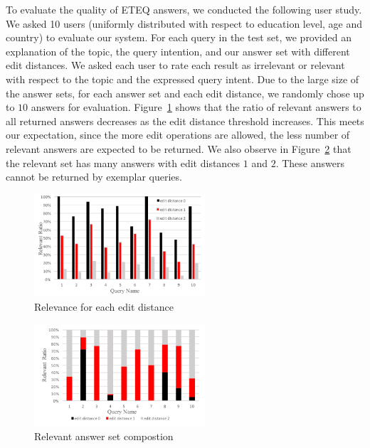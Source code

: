 \documentclass{sigmod}
\begin{document}
To evaluate the quality of ETEQ answers, we conducted the following user study. We asked 10 users (uniformly distributed with respect to education level, age and country) to evaluate our system. For each query in the test set, we provided an explanation of the topic, the query intention, and our answer set with different edit distances. We asked each user to rate each result as irrelevant or relevant with respect to the topic and the expressed query intent. Due to the large size of the answer sets, for each answer set and each edit distance, we randomly chose up to $10$ answers for evaluation. Figure~\ref{fig:relevance} shows that the ratio of relevant answers to all returned answers decreases as the edit distance threshold increases. This meets our expectation, since the more edit operations are allowed, the less number of relevant answers are expected to be returned. We also observe in Figure~\ref{fig:exqcomp1} that the relevant set has many answers with edit distances $1$ and $2$. These answers cannot be returned by exemplar queries. 


\begin{figure}[htbp] 
\setlength{\abovecaptionskip}{-0.5\baselineskip}
\setlength{\belowcaptionskip}{-0.5\baselineskip}
\centering\includegraphics[width=2.5in]{relevance.pdf} 
\caption{Relevance for each edit distance}
\label{fig:relevance}
\end{figure}

\begin{figure}[htbp] 
\setlength{\abovecaptionskip}{-0.5\baselineskip}
\setlength{\belowcaptionskip}{-0.5\baselineskip}
\centering\includegraphics[width=2.5in]{exqcomp1.pdf} 
\caption{Relevant answer set compostion}
\label{fig:exqcomp1}
\end{figure}
\end{document}
